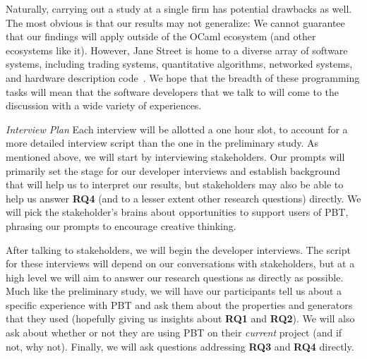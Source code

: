 Naturally, carrying out a study at a single firm has potential drawbacks as
well. The most obvious is that our results may not generalize: We
cannot guarantee that our findings will apply outside of the OCaml ecosystem (and
other ecosystems like it). However, Jane Street is home to a diverse array of
software systems, including trading systems, quantitative
algorithms, networked systems, and hardware description code~\cite{signalsandthreads}.
We hope that the breadth of these programming tasks will mean that the software
developers that we talk to will come to the discussion with a wide variety of
experiences.


\textit{Interview Plan}
Each interview will be allotted a one hour slot, to account for a more detailed
interview script than the one in the preliminary study. As mentioned above, we
will start by interviewing stakeholders. Our prompts will primarily set the
stage for our developer interviews and establish background that will help us to
interpret our results, but stakeholders may also be able to help us answer {\bf
RQ4} (and to a lesser extent other research questions) directly. We will pick
the stakeholder's brains about opportunities to support users
of PBT, phrasing our prompts to encourage creative thinking.

After talking to stakeholders, we will begin the developer interviews. The
script for these interviews will depend on our conversations with stakeholders,
but at a high level we will aim to answer our research questions as directly as
possible. Much like the preliminary study, we will have our participants tell us about a
specific experience with PBT and ask them about the properties and generators
that they used (hopefully giving us insights about {\bf RQ1} and {\bf RQ2}).  We
will also ask about whether or not they are using PBT on their {\em current}
project (and if not, why not). Finally, we will ask questions addressing
{\bf RQ3} and {\bf RQ4} directly.


